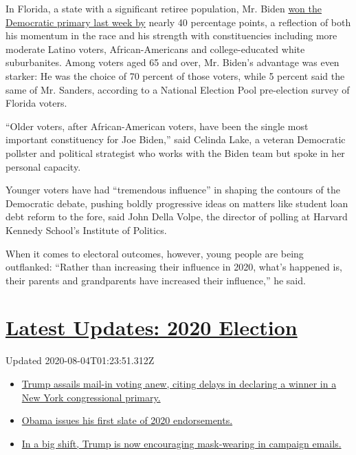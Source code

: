 In Florida, a state with a significant retiree population, Mr. Biden
\href{https://www.nytimes.com/interactive/2020/03/17/us/elections/results-florida-president-democrat-primary-election.html}{won
the Democratic primary last week by} nearly 40 percentage points, a
reflection of both his momentum in the race and his strength with
constituencies including more moderate Latino voters, African-Americans
and college-educated white suburbanites. Among voters aged 65 and over,
Mr. Biden's advantage was even starker: He was the choice of 70 percent
of those voters, while 5 percent said the same of Mr. Sanders, according
to a National Election Pool pre-election survey of Florida voters.

``Older voters, after African-American voters, have been the single most
important constituency for Joe Biden,'' said Celinda Lake, a veteran
Democratic pollster and political strategist who works with the Biden
team but spoke in her personal capacity.

Younger voters have had ``tremendous influence'' in shaping the contours
of the Democratic debate, pushing boldly progressive ideas on matters
like student loan debt reform to the fore, said John Della Volpe, the
director of polling at Harvard Kennedy School's Institute of Politics.

When it comes to electoral outcomes, however, young people are being
outflanked: ``Rather than increasing their influence in 2020, what's
happened is, their parents and grandparents have increased their
influence,'' he said.

\hypertarget{latest-updates-2020-election}{%
\section{\texorpdfstring{\href{https://www.nytimes.com/2020/08/03/us/elections/biden-vs-trump.html?action=click\&pgtype=Article\&state=default\&region=MAIN_CONTENT_1\&context=storylines_live_updates}{Latest
Updates: 2020
Election}}{Latest Updates: 2020 Election}}\label{latest-updates-2020-election}}

Updated 2020-08-04T01:23:51.312Z

\begin{itemize}
\tightlist
\item
  \href{https://www.nytimes.com/2020/08/03/us/elections/biden-vs-trump.html?action=click\&pgtype=Article\&state=default\&region=MAIN_CONTENT_1\&context=storylines_live_updates\#link-6494b448}{Trump
  assails mail-in voting anew, citing delays in declaring a winner in a
  New York congressional primary.}
\item
  \href{https://www.nytimes.com/2020/08/03/us/elections/biden-vs-trump.html?action=click\&pgtype=Article\&state=default\&region=MAIN_CONTENT_1\&context=storylines_live_updates\#link-3de249e6}{Obama
  issues his first slate of 2020 endorsements.}
\item
  \href{https://www.nytimes.com/2020/08/03/us/elections/biden-vs-trump.html?action=click\&pgtype=Article\&state=default\&region=MAIN_CONTENT_1\&context=storylines_live_updates\#link-54e34d20}{In
  a big shift, Trump is now encouraging mask-wearing in campaign
  emails.}
\end{itemize}


